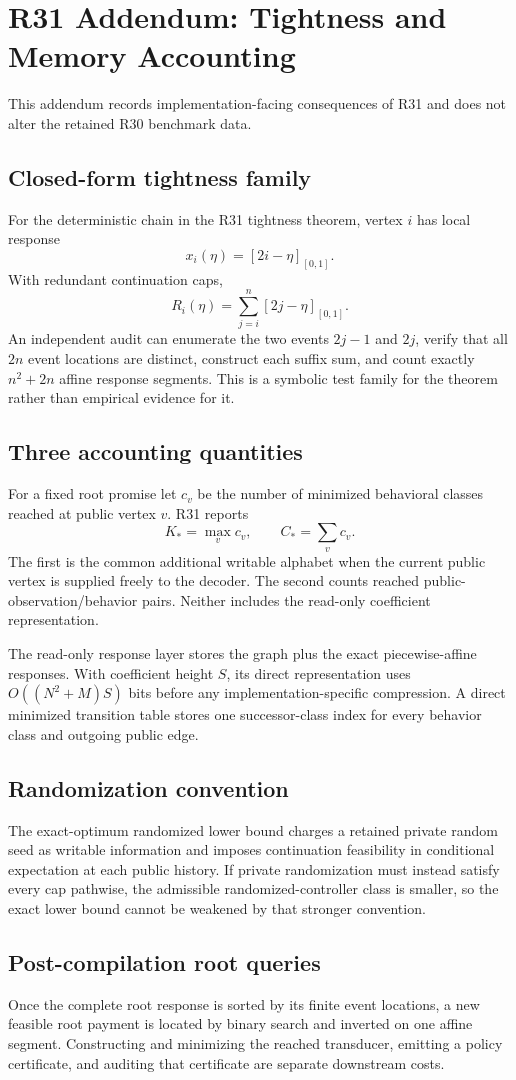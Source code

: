 \section{R31 Addendum: Tightness and Memory Accounting}\label{ec:r31-addendum}
This addendum records implementation-facing consequences of R31 and does not alter the retained R30 benchmark data.

\subsection{Closed-form tightness family}
For the deterministic chain in the R31 tightness theorem, vertex $i$ has local response
\[
 x_i(\eta)=[2i-\eta]_{[0,1]}.
\]
With redundant continuation caps,
\[
 R_i(\eta)=\sum_{j=i}^{n}[2j-\eta]_{[0,1]}.
\]
An independent audit can enumerate the two events $2j-1$ and $2j$, verify that all $2n$ event locations are distinct, construct each suffix sum, and count exactly $n^2+2n$ affine response segments. This is a symbolic test family for the theorem rather than empirical evidence for it.

\subsection{Three accounting quantities}
For a fixed root promise let $c_v$ be the number of minimized behavioral classes reached at public vertex $v$. R31 reports
\[
 K_*=\max_v c_v,\qquad C_*=\sum_v c_v.
\]
The first is the common additional writable alphabet when the current public vertex is supplied freely to the decoder. The second counts reached public-observation/behavior pairs. Neither includes the read-only coefficient representation.

The read-only response layer stores the graph plus the exact piecewise-affine responses. With coefficient height $S$, its direct representation uses $O((N^2+M)S)$ bits before any implementation-specific compression. A direct minimized transition table stores one successor-class index for every behavior class and outgoing public edge.

\subsection{Randomization convention}
The exact-optimum randomized lower bound charges a retained private random seed as writable information and imposes continuation feasibility in conditional expectation at each public history. If private randomization must instead satisfy every cap pathwise, the admissible randomized-controller class is smaller, so the exact lower bound cannot be weakened by that stronger convention.

\subsection{Post-compilation root queries}
Once the complete root response is sorted by its finite event locations, a new feasible root payment is located by binary search and inverted on one affine segment. Constructing and minimizing the reached transducer, emitting a policy certificate, and auditing that certificate are separate downstream costs.
